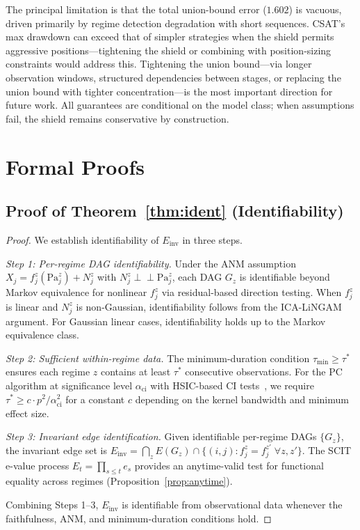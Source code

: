 \documentclass[11pt]{article}
\begin{document}
The principal limitation is that the total union-bound error ($1.602$)
is vacuous, driven primarily by regime detection degradation with
short sequences.  CSAT's max drawdown can exceed that of simpler
strategies when the shield permits aggressive positions---tightening
the shield or combining with position-sizing constraints would
address this.  Tightening the union bound---via longer observation
windows, structured dependencies between stages, or replacing the
union bound with tighter concentration---is the most important
direction for future work.  All guarantees are conditional on the
model class; when assumptions fail, the shield remains conservative
by construction.


\newpage
\appendix

\section{Formal Proofs}\label{app:proofs}

\subsection{Proof of Theorem~\ref{thm:ident} (Identifiability)}

\begin{proof}
We establish identifiability of $E_{\mathrm{inv}}$ in three steps.

\emph{Step 1: Per-regime DAG identifiability.}
Under the ANM assumption $X_j = f^z_j(\mathrm{Pa}_j^z) + N^z_j$
with $N^z_j \perp\!\!\!\perp \mathrm{Pa}_j^z$, each DAG $G_z$ is
identifiable beyond Markov equivalence for nonlinear $f^z_j$ via
residual-based direction testing.  When $f^z_j$ is linear and $N^z_j$
is non-Gaussian, identifiability follows from the ICA-LiNGAM argument.
For Gaussian linear cases, identifiability holds up to the Markov
equivalence class.

\emph{Step 2: Sufficient within-regime data.}
The minimum-duration condition $\tau_{\min} \geq \tau^*$ ensures each
regime $z$ contains at least $\tau^*$ consecutive observations.  For
the PC algorithm at significance level $\alpha_{\mathrm{ci}}$ with
HSIC-based CI tests~\cite{zhang2012kernel}, we require
$\tau^* \geq c \cdot p^2 / \alpha_{\mathrm{ci}}^2$
for a constant $c$ depending on the kernel bandwidth and minimum
effect size.

\emph{Step 3: Invariant edge identification.}
Given identifiable per-regime DAGs $\{G_z\}$, the invariant edge set
is
$E_{\mathrm{inv}} = \bigcap_z E(G_z) \cap
\{(i,j) : f^z_j = f^{z'}_j \;\forall z, z'\}$.
The SCIT e-value process $E_t = \prod_{s \leq t} e_s$ provides an
anytime-valid test for functional equality across regimes
(Proposition~\ref{prop:anytime}).

Combining Steps 1--3, $E_{\mathrm{inv}}$ is identifiable from
observational data whenever the faithfulness, ANM, and
minimum-duration conditions hold.
\end{proof}
\end{document}
